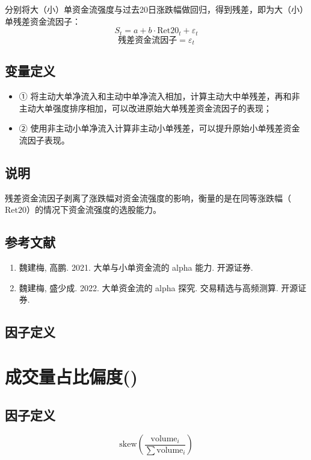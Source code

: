 \documentclass{article}
\begin{document}
分别将大（小）单资金流强度与过去20日涨跌幅做回归，得到残差，即为大（小）单残差资金流因子：
\begin{equation}
    S_t = a + b \cdot \mathrm{Ret20}_t + \varepsilon_t
\end{equation}
\begin{equation}
    \text{残差资金流因子} = \varepsilon_t
\end{equation}

\subsection{变量定义}
\begin{itemize}
    \item ① 将主动大单净流入和主动中单净流入相加，计算主动大中单残差，再和非主动大单强度排序相加，可以改进原始大单残差资金流因子的表现；
    \item ② 使用非主动小单净流入计算非主动小单残差，可以提升原始小单残差资金流因子表现。
\end{itemize}

\subsection{说明}
残差资金流因子剥离了涨跌幅对资金流强度的影响，衡量的是在同等涨跌幅（\(\mathrm{Ret20}\)）的情况下资金流强度的选股能力。

\subsection{参考文献}
\begin{enumerate}
    \item 魏建梅, 高鹏. 2021. 大单与小单资金流的 alpha 能力. 开源证券.
    \item 魏建梅, 盛少成. 2022. 大单资金流的 alpha 探究. 交易精选与高频测算. 开源证券.
\end{enumerate}

\subsection{因子定义}
\section{成交量占比偏度()}

\subsection{因子定义}
\begin{equation}
    \mathrm{skew}\left(\frac{\mathrm{volume}_i}{\sum \mathrm{volume}_i}\right)
\end{equation}
\end{document}
